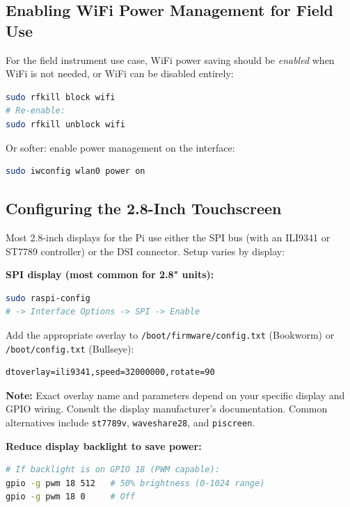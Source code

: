 \documentclass[11pt,letter]{article}
\begin{document}
\subsection{Enabling WiFi Power Management for Field Use}

For the field instrument use case, WiFi power saving should be \emph{enabled} when WiFi is not needed, or WiFi can be disabled entirely:

\begin{lstlisting}[language=bash, caption={Disable WiFi entirely to save power}]
sudo rfkill block wifi
# Re-enable:
sudo rfkill unblock wifi
\end{lstlisting}

Or softer: enable power management on the interface:
\begin{lstlisting}[language=bash]
sudo iwconfig wlan0 power on
\end{lstlisting}

\subsection{Configuring the 2.8-Inch Touchscreen}

Most 2.8-inch displays for the Pi use either the SPI bus (with an ILI9341 or ST7789 controller) or the DSI connector. Setup varies by display:

\textbf{SPI display (most common for 2.8" units):}
\begin{lstlisting}[language=bash, caption={Enable SPI in config}]
sudo raspi-config
# -> Interface Options -> SPI -> Enable
\end{lstlisting}

Add the appropriate overlay to \texttt{/boot/firmware/config.txt} (Bookworm) or \texttt{/boot/config.txt} (Bullseye):
\begin{lstlisting}[caption={Example config.txt entry for ILI9341 display}]
dtoverlay=ili9341,speed=32000000,rotate=90
\end{lstlisting}

\begin{notebox}
\textbf{Note:} Exact overlay name and parameters depend on your specific display and GPIO wiring. Consult the display manufacturer's documentation. Common alternatives include \texttt{st7789v}, \texttt{waveshare28}, and \texttt{piscreen}.
\end{notebox}

\textbf{Reduce display backlight to save power:}
\begin{lstlisting}[language=bash, caption={Dim or blank the backlight via GPIO or PWM}]
# If backlight is on GPIO 18 (PWM capable):
gpio -g pwm 18 512   # 50% brightness (0-1024 range)
gpio -g pwm 18 0     # Off
\end{lstlisting}
\end{document}

